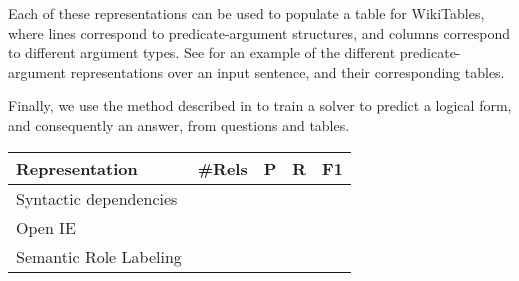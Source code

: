 Each of these representations can be used to populate a table for WikiTables,
where lines correspond to predicate-argument structures,
and columns correspond to different argument types.
See  for an example of the different predicate-argument
representations over an input sentence, and their corresponding tables.

Finally, we use the method described in \cite{Krishnamurthy2017neuralsp}
to train a solver to predict a logical form, and consequently an answer, from questions and tables.

\begin{table}[]
\begin{tabular}{@{}lllll@{}}
\toprule
Representation         & \#Rels & P & R & F1 \\ \midrule
Syntactic dependencies &             &           &        &    \\
Open IE                &             &           &        &    \\
Semantic Role Labeling  &             &           &        &    \\ \bottomrule
\end{tabular}
\end{table}

